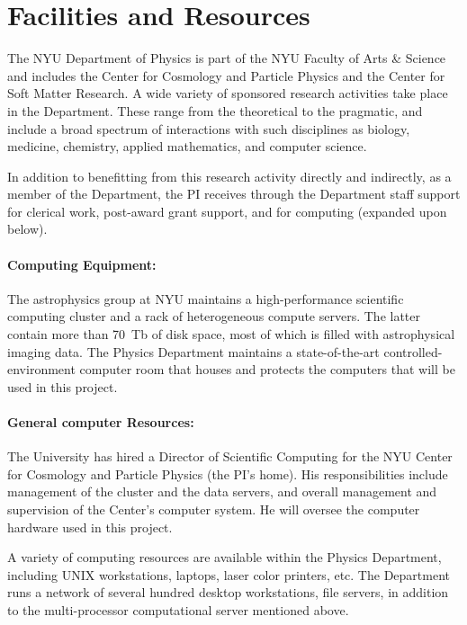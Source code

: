 \documentclass[letterpaper,12pt]{article}
\begin{document}
\section*{Facilities and Resources}

The NYU Department of Physics is part of the NYU Faculty of Arts \&
Science and includes the Center for Cosmology and Particle Physics and
the Center for Soft Matter Research.  A wide variety of sponsored
research activities take place in the Department.  These range from
the theoretical to the pragmatic, and include a broad spectrum of
interactions with such disciplines as biology, medicine, chemistry,
applied mathematics, and computer science.

In addition to benefitting from this research activity directly and
indirectly, as a member of the Department, the PI receives through the
Department staff support for clerical work, post-award grant support,
and for computing (expanded upon below).

\paragraph{Computing Equipment:}

The astrophysics group at NYU maintains a high-performance scientific
computing cluster and a rack of heterogeneous compute servers.  The
latter contain more than 70~Tb of disk space, most of which is filled
with astrophysical imaging data.  The Physics Department maintains a
state-of-the-art controlled-environment computer room that houses and
protects the computers that will be used in this project.

\paragraph{General computer Resources:}

The University has hired a Director of Scientific Computing for the
NYU Center for Cosmology and Particle Physics (the PI's home).  His
responsibilities include management of the cluster and the data
servers, and overall management and supervision of the Center's
computer system.  He will oversee the computer hardware used in this
project.

A variety of computing resources are available within the Physics
Department, including UNIX workstations, laptops, laser color
printers, etc.  The Department runs a network of several hundred
desktop workstations, file servers, in addition to the multi-processor
computational server mentioned above.
\end{document}
